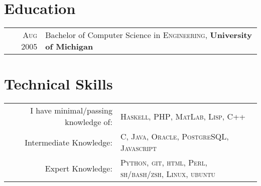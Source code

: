 \documentclass[a4paper,10pt]{article}
\begin{document}
    
        \section{Education}
        \begin{tabular}{rl}
        \textsc{Aug} 2005 & Bachelor of Computer Science in \textsc{Engineering}, \textbf{University of Michigan}\\
        \end{tabular}
    

    
        \section{Technical Skills}
        \begin{tabular}{rl}
        I have minimal/passing knowledge of: & \textsc{Haskell},
                                   \textsc{PHP},
                                   \textsc{MatLab},
                                   \textsc{Lisp},
                                   \textsc{C++} \\
        Intermediate Knowledge: & \textsc{C},
                                    \textsc{Java},
                                    \textsc{Oracle},
                                    \textsc{PostgreSQL},
                                    \textsc{Javascript} \\
        Expert Knowledge: & \textsc{Python},
                                \textsc{git},
                                \textsc{html},
                                \textsc{Perl},
                                \textsc{sh/bash/zsh},
                                \textsc{Linux},
                                \textsc{ubuntu} \\
        \end{tabular}
    

    
    
\end{document}
